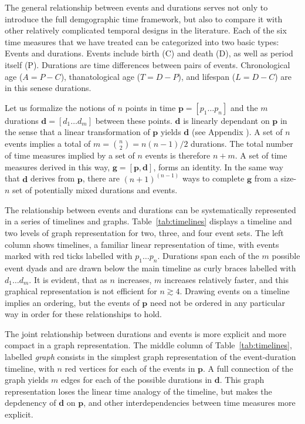 \documentclass[12pt,oneside,a4paper]{article} %
\newcommand\vt[1]{\textcolor{rd}{#1}}
\begin{document}
The general relationship between events and durations serves not only to
introduce the full demgographic time framework, but also to compare it with
other relatively complicated temporal designs in the literature. Each of the six
time measures that we have treated can be categorized into two basic types:
Events and durations. Events include birth (C) and death (D), as well as period
itself (P).
Durations are time differences between pairs of
events. Chronological age ($A=P-C$), thanatological age ($T=D-P$), and lifespan
($L=D-C$) are in this senese durations. 

Let us formalize the notions of $n$ points in time $\textbf{p} = [p_1 \ldots
p_n]$ and the $m$ durations $\textbf{d} = [d_1 \ldots d_m]$ between these
points. $\textbf{d}$ is linearly dependant on $\textbf{p}$ in the sense that a
linear transformation of $\textbf{p}$ yields $\textbf{d}$ (see \vt{Appendix} ).
A set of $n$ events implies a total of $m = \binom{n}{2} = n(n - 1)/2$
durations. The total number of time measures implied by a set of $n$ events is
therefore $n + m$. A set of time measures derived in this way,
$\textbf{g} = [\textbf{p}, \textbf{d}]$, forms an identity. In the same way that
$\textbf{d}$ derives from $\textbf{p}$, there are $(n+1)^{(n-1)}$ ways to
complete $\textbf{g}$ from a size-$n$ set of potentially mixed durations and
events. 

The relationship between events and durations can be systematically represented
in a series of timelines and graphs. Table~\ref{tab:timelines} displays a timeline and two levels of graph representation for two, three, and four event sets. The left
column shows timelines, a familiar linear representation of time, with events
marked with red ticks labelled with $p_1 \ldots p_n$. Durations span
each of the $m$ possible event dyads and are drawn below
the main timeline as curly braces labelled with $d_1 \ldots d_m$. It is evident,
that as $n$ increases, $m$ increases relatively faster, and this
graphical representation is not efficient for $n \gtrsim 4$. Drawing events on a
timeline implies an ordering, but the events of $\textbf{p}$
need not be ordered in any particular way in order for these relationships to
hold.

The joint relationship between durations and events is more explicit and more
compact in a graph representation. The middle column of
Table~\ref{tab:timelines}, labelled \textit{graph} consists in the simplest
graph representation of the event-duration timeline, with $n$ red vertices for
each of the events in $\textbf{p}$. A full connection of the graph yields $m$
edges for each of the possible durations in $\textbf{d}$. This graph
representation loses the linear time analogy of the timeline, but makes the
depdenency of $\textbf{d}$ on $\textbf{p}$, and other interdependencies between time measures more explicit.
\end{document}
